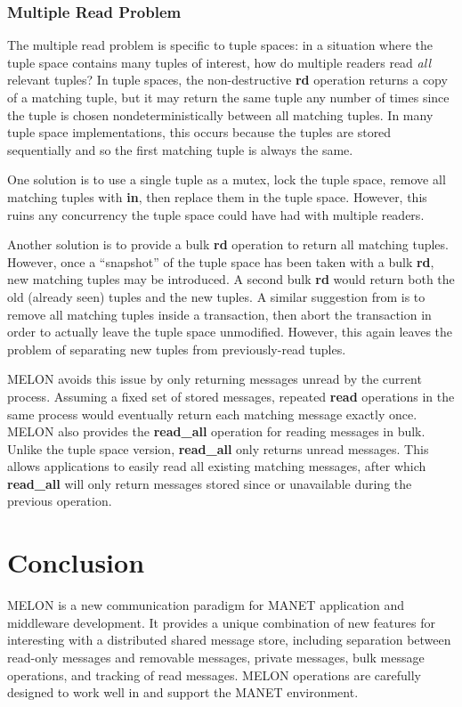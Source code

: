 \documentclass[lnicst]{svmultln}
\begin{document}
\subsubsection{Multiple Read Problem}

The multiple read problem \cite{mrdp} is specific to tuple spaces: in a situation where the tuple space contains many tuples of interest, how do multiple readers read \textit{all} relevant tuples? In tuple spaces, the non-destructive \textbf{rd} operation returns a copy of a matching tuple, but it may return the same tuple any number of times since the tuple is chosen nondeterministically between all matching tuples. In many tuple space implementations, this occurs because the tuples are stored sequentially and so the first matching tuple is always the same\cite{de2012new}.

One solution is to use a single tuple as a mutex, lock the tuple space, remove all matching tuples with \textbf{in}, then replace them in the tuple space. However, this ruins any concurrency the tuple space could have had with multiple readers.

Another solution is to provide a bulk \textbf{rd} operation to return all matching tuples. However, once a ``snapshot'' of the tuple space has been taken with a bulk \textbf{rd}, new matching tuples may be introduced. A second bulk \textbf{rd} would return both the old (already seen) tuples and the new tuples. A similar suggestion from \cite{edwards2001jini} is to remove all matching tuples inside a transaction, then abort the transaction in order to actually leave the tuple space unmodified. However, this again leaves the problem of separating new tuples from previously-read tuples.

MELON avoids this issue by only returning messages unread by the current process. Assuming a fixed set of stored messages, repeated \textbf{read} operations in the same process would eventually return each matching message exactly once. MELON also provides the \textbf{read\_all} operation for reading messages in bulk. Unlike the tuple space version, \textbf{read\_all} only returns unread messages. This allows applications to easily read all existing matching messages, after which \textbf{read\_all} will only return messages stored since or unavailable during the previous operation.

\section{Conclusion}

MELON is a new communication paradigm for MANET application and middleware development. It provides a unique combination of new features for interesting with a distributed shared message store, including separation between read-only messages and removable messages, private messages, bulk message operations, and tracking of read messages. MELON operations are carefully designed to work well in and support the MANET environment.



\end{document}
